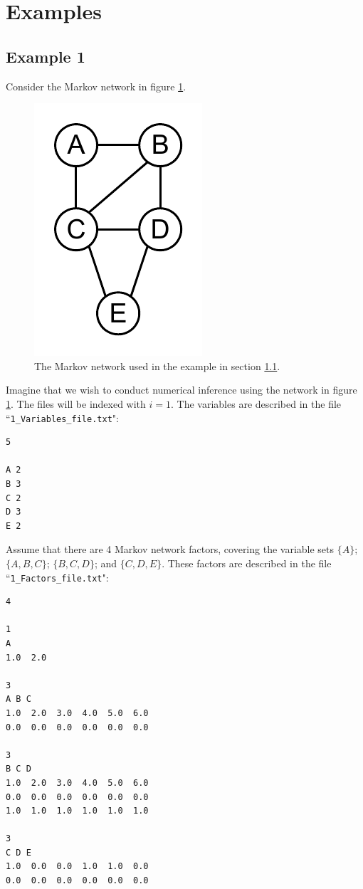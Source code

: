 \documentclass{article}
\begin{document}
\section{Examples}\label{sec:Examples}

\subsection{Example 1}\label{sec:Example_1}

Consider the Markov network in figure \ref{fig:Belief_network_1}.

\begin{figure}[!h]
\begin{center}
\includegraphics{fig/Belief_network_1}
\caption{The Markov network used in the example in section \ref{sec:Example_1}.}
\label{fig:Belief_network_1}
\end{center}
\end{figure}

Imagine that we wish to conduct numerical inference using the network in figure \ref{fig:Belief_network_1}. The files will be indexed with \(i = 1\). The variables are described in the file ``\texttt{1\_Variables\_file.txt}":
\begin{verbatim}
5

A 2
B 3
C 2
D 3
E 2
\end{verbatim}

Assume that there are 4 Markov network factors, covering the variable sets \(\{A\}\); \(\{A, B, C\}\); \(\{B, C, D\}\); and \(\{C, D, E\}\). These factors are described in the file ``\texttt{1\_Factors\_file.txt}":
\begin{verbatim}
4

1
A
1.0  2.0

3
A B C
1.0  2.0  3.0  4.0  5.0  6.0  
0.0  0.0  0.0  0.0  0.0  0.0

3
B C D
1.0  2.0  3.0  4.0  5.0  6.0
0.0  0.0  0.0  0.0  0.0  0.0
1.0  1.0  1.0  1.0  1.0  1.0

3
C D E
1.0  0.0  0.0  1.0  1.0  0.0  
0.0  0.0  0.0  0.0  0.0  0.0
\end{verbatim}
\end{document}
